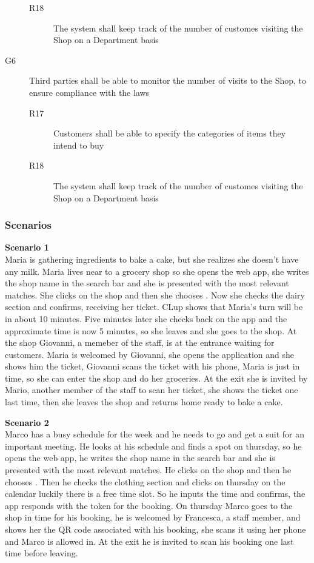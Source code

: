 \begin{description}
\begin{description}
              \item [R18] The system shall keep track of the number of customes visiting the Shop on a Department basis
          \end{description}
    \item [G6]  Third parties shall be able to monitor the number of visits to the Shop, to ensure compliance with the laws
          \begin{description}
              \item [R17] Customers shall be able to specify the categories of items they intend to buy
              \item [R18] The system shall keep track of the number of customes visiting the Shop on a Department basis
          \end{description}
\end{description}

\subsubsection{Scenarios}
\textbf{Scenario 1}\\
Maria is gathering ingredients to bake a cake, but she realizes she doesn't have any milk.
Maria lives near to a grocery shop so she opens the web app, she writes the shop name in the search bar and she is presented with the most relevant matches. She clicks on the shop and then she chooses . Now she checks the dairy section and confirms, receiving her ticket.
CLup shows that Maria's turn will be in about 10 minutes. Five minutes later she checks back on the app and the approximate time is now 5 minutes, so she leaves and she goes to the shop.
At the shop Giovanni, a memeber of the staff, is at the entrance waiting for customers. Maria is welcomed by Giovanni, she opens the application and she shows him the ticket, Giovanni scans the ticket with his phone, Maria is just in time, so she can enter the shop and do her groceries.
At the exit she is invited by Mario, another member of the staff to scan her ticket, she shows the ticket one last time, then she leaves the shop and returns home ready to bake a cake.

\textbf{Scenario 2}\\
Marco has a busy schedule for the week and he needs to go and get a suit for an important meeting. He looks at his schedule and finds a spot on thursday, so he opens the web app, he writes the shop name in the search bar and she is presented with the most relevant matches. He clicks on the shop and then he chooses . Then he checks the clothing section and clicks on thursday on the calendar luckily there is a free time slot. So he inputs the time and confirms, the app responds with the token for the booking. On thursday Marco goes to the shop in time for his booking, he is welcomed by Francesca, a staff member, and shows her the QR code associated with his booking, she scans it using her phone and Marco is allowed in. At the exit he is invited to scan his booking one last time before leaving.

